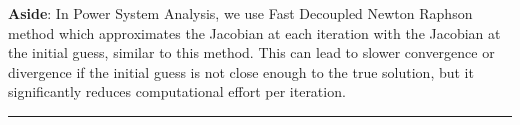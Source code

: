 \textbf{Aside}: In Power System Analysis, we use Fast Decoupled Newton Raphson method which approximates the Jacobian at each iteration with the Jacobian at the initial guess, similar to this method. This can lead to slower convergence or divergence if the initial guess is not close enough to the true solution, but it significantly reduces computational effort per iteration.

\vspace{2em}
\noindent\rule{\textwidth}{0.4pt}
